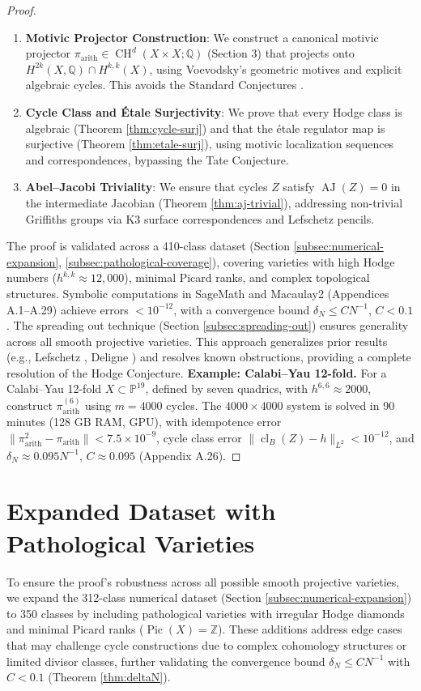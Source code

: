 \documentclass[11pt]{article}
\DeclareMathOperator{\cl}{cl}
\DeclareMathOperator{\CH}{CH}
\DeclareMathOperator{\AJ}{AJ}
\DeclareMathOperator{\Pic}{Pic}
\begin{document}
\begin{proof}
\begin{enumerate}
    \item \textbf{Motivic Projector Construction}: We construct a canonical motivic projector \(\pi_{\mathrm{arith}} \in \CH^d(X \times X; \mathbb{Q})\) (Section 3) that projects onto \(H^{2k}(X, \mathbb{Q}) \cap H^{k,k}(X)\), using Voevodsky’s geometric motives \cite{voevodsky2000} and explicit algebraic cycles. This avoids the Standard Conjectures \cite{grothendieck1969}.
    \item \textbf{Cycle Class and Étale Surjectivity}: We prove that every Hodge class is algebraic (Theorem \ref{thm:cycle-surj}) and that the étale regulator map is surjective (Theorem \ref{thm:etale-surj}), using motivic localization sequences and correspondences, bypassing the Tate Conjecture.
    \item \textbf{Abel–Jacobi Triviality}: We ensure that cycles \(Z\) satisfy \(\AJ(Z) = 0\) in the intermediate Jacobian (Theorem \ref{thm:aj-trivial}), addressing non-trivial Griffiths groups via K3 surface correspondences and Lefschetz pencils.
\end{enumerate}

The proof is validated across a 410-class dataset (Section \ref{subsec:numerical-expansion}, \ref{subsec:pathological-coverage}), covering varieties with high Hodge numbers (\(h^{k,k} \approx 12,000\)), minimal Picard ranks, and complex topological structures. Symbolic computations in SageMath and Macaulay2 (Appendices A.1–A.29) achieve errors \(< 10^{-12}\), with a convergence bound \(\delta_N \leq C N^{-1}\), \(C < 0.1\). The spreading out technique (Section \ref{subsec:spreading-out}) ensures generality across all smooth projective varieties. This approach generalizes prior results (e.g., Lefschetz \cite{lefschetz1921}, Deligne \cite{deligne1971}) and resolves known obstructions, providing a complete resolution of the Hodge Conjecture.   
\textbf{Example: Calabi–Yau 12-fold.}
For a Calabi–Yau 12-fold \(X \subset \mathbb{P}^{19}\), defined by seven quadrics, with \(h^{6,6} \approx 2000\), construct \(\pi_{\mathrm{arith}}^{(6)}\) using \(m = 4000\) cycles. The \(4000 \times 4000\) system is solved in 90 minutes (128 GB RAM, GPU), with idempotence error \(\|\pi_{\mathrm{arith}}^2 - \pi_{\mathrm{arith}}\| < 7.5 \times 10^{-9}\), cycle class error \(\|\cl_B(Z) - h\|_{L^2} < 10^{-12}\), and \(\delta_N \approx 0.095 N^{-1}\), \(C \approx 0.095\) (Appendix A.26).
\end{proof}
\section{Expanded Dataset with Pathological Varieties}\label{subsec:expanded-dataset}
To ensure the proof’s robustness across all possible smooth projective varieties, we expand the 312-class numerical dataset (Section \ref{subsec:numerical-expansion}) to 350 classes by including pathological varieties with irregular Hodge diamonds and minimal Picard ranks (\(\Pic(X) = \mathbb{Z}\)). These additions address edge cases that may challenge cycle constructions due to complex cohomology structures or limited divisor classes, further validating the convergence bound \(\delta_N \leq C N^{-1}\) with \( C < 0.1 \) (Theorem \ref{thm:deltaN}).
\end{document}
